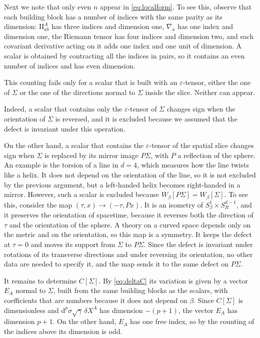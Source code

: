 \documentclass[a4paper,11pt]{article}
\newcommand{\II}{\mathrm{I\!I}}
\newcommand{\dd}{\mathrm{d}}
\begin{document}
Next we note that only even $n$ appear in \eqref{eq:localform}. To see this, observe that each building block has a number of indices with the same parity as its dimension: $\II^A_{ab}$ has three indices and dimension one, $\nabla_a$ has one index and dimension one, the Riemann tensor has four indices and dimension two, and each covariant derivative acting on it adds one index and one unit of dimension. A scalar is obtained by contracting all the indices in pairs, so it contains an even number of indices and has even dimension.

This counting fails only for a scalar that is built with an $\varepsilon$-tensor, either the one of $\Sigma$ or the one of the directions normal to $\Sigma$ inside the slice. Neither can appear. 
	
	Indeed, a scalar that contains only the $\varepsilon$-tensor of $\Sigma$ changes sign when the orientation of $\Sigma$ is reversed, and it is excluded because we assumed that the defect is invariant under this operation.
	
	On the other hand, a scalar that contains the $\varepsilon$-tensor of the spatial slice changes sign when $\Sigma$ is replaced by its mirror image $P\Sigma$, with $P$ a reflection of the sphere. An example is the torsion of a line in $d=4$, which measures how the line twists like a helix. It does not depend on the orientation of the line, so it is not excluded by the previous argument, but a left-handed helix becomes right-handed in a mirror. However, such a scalar is excluded because $W_\beta[P\Sigma]=W_\beta[\Sigma]$. To see this, consider the map $(\tau,x)\to(-\tau,Px)$. It is an isometry of $S^1_\beta\times S^{d-1}_R$, and it preserves the orientation of spacetime, because it reverses both the direction of $\tau$ and the orientation of the sphere. A theory on a curved space depends only on the metric and on the orientation, so this map is a symmetry. It keeps the defect at $\tau=0$ and moves its support from $\Sigma$ to $P\Sigma$. Since the defect is invariant under rotations of its transverse directions and under reversing its orientation, no other data are needed to specify it, and the map sends it to the same defect on $P\Sigma$.


It remains to determine $C[\Sigma]$. By \eqref{eq:deltaC} its variation is given by a vector $E_A$ normal to $\Sigma$, built from the same building blocks as the scalars, with coefficients that are numbers because it does not depend on $\beta$. Since $C[\Sigma]$ is dimensionless and $\dd^p\sigma\sqrt\gamma\,\delta X^A$ has dimension $-(p+1)$, the vector $E_A$ has dimension $p+1$. On the other hand, $E_A$ has one free index, so by the counting of the indices above its dimension is odd.
\end{document}
